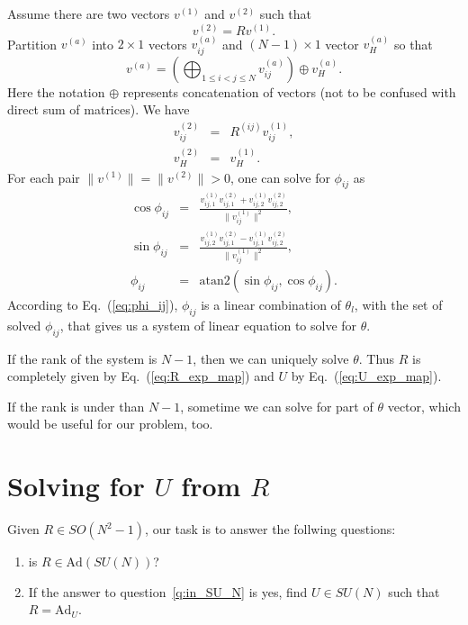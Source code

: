 \documentclass{article}
\begin{document}
Assume there are two vectors $v^{(1)}$ and $v^{(2)}$ such that
\begin{equation}
  v^{(2)} = Rv^{(1)}.
\end{equation}
Partition $v^{(a)}$ into $2\times1$ vectors $v^{(a)}_{ij}$ and
$(N-1)\times1$ vector $v^{(a)}_H$ so that
\begin{equation}
  v^{(a)} = \left(\bigoplus_{1\le i < j \le N}v^{(a)}_{ij}\right)\oplus v^{(a)}_H.
\end{equation}
Here the notation $\oplus$ represents concatenation of vectors
(not to be confused with direct sum of matrices).
We have
\begin{eqnarray}
  v^{(2)}_{ij} & = & R^{(ij)}v^{(1)}_{ij}, \\
  v^{(2)}_H & = & v^{(1)}_H.
\end{eqnarray}
For each pair $\lVert v^{(1)}\rVert = \lVert v^{(2)}\rVert > 0$,
one can solve for $\phi_{ij}$ as
\begin{eqnarray}
  \cos\phi_{ij} & = & \frac{v^{(1)}_{ij,1}v^{(2)}_{ij,1}+v^{(1)}_{ij,2}v^{(2)}_{ij,2}}
          {\lVert v^{(1)}_{ij}\rVert^2}, \\
  \sin\phi_{ij} & = & \frac{v^{(1)}_{ij,2}v^{(2)}_{ij,1}-v^{(1)}_{ij,1}v^{(2)}_{ij,2}}
          {\lVert v^{(1)}_{ij}\rVert^2}, \\
  \phi_{ij} & = & \text{atan2}(\sin\phi_{ij}, \cos\phi_{ij}).
\end{eqnarray}
According to Eq.~(\ref{eq:phi_ij}), $\phi_{ij}$ is a linear combination
of $\theta_l$, with the set of solved $\phi_{ij}$, that gives us a system of
linear equation to solve for $\theta$.

If the rank of the system is $N-1$, then we can uniquely solve $\theta$.
Thus $R$ is completely given by Eq.~(\ref{eq:R_exp_map}) and $U$ by
Eq.~(\ref{eq:U_exp_map}).

If the rank is under than $N-1$,
sometime we can solve for part of $\theta$ vector, which would be useful
for our problem, too.

\section{Solving for \texorpdfstring{$U$}{U} from \texorpdfstring{$R$}{R}}
\label{appendix:general_U}
Given $R\in SO(N^2-1)$, our task is to answer the follwing questions:
\begin{enumerate}
\item \label{q:in_SU_N}is $R\in\text{Ad}(SU(N))$?
\item \label{q:found_u}If the answer to question~\ref{q:in_SU_N} is yes,
  find $U\in SU(N)$ such that $R = \text{Ad}_U$.
\end{enumerate}
\end{document}
